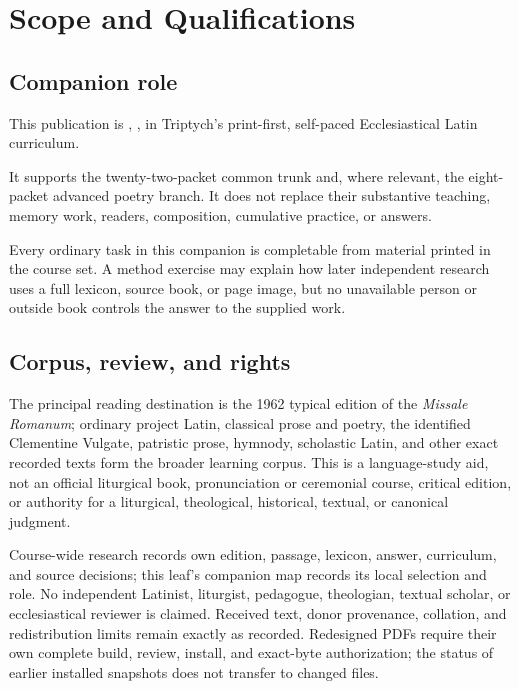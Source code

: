 \chapter{Scope and Qualifications}

\section{Companion role}

This publication is \CompanionID, \emph{\CompanionTitle}, in Triptych's
print-first, self-paced Ecclesiastical Latin curriculum. \CompanionBoundary

It supports the twenty-two-packet common trunk and, where relevant, the
eight-packet advanced poetry branch.  It does not replace their substantive
teaching, memory work, readers, composition, cumulative practice, or answers.
\CompanionPacingNote

Every ordinary task in this companion is completable from material printed in
the course set.  A method exercise may explain how later independent research
uses a full lexicon, source book, or page image, but no unavailable person or
outside book controls the answer to the supplied work.

\section{Corpus, review, and rights}

The principal reading destination is the 1962 typical edition of the
\emph{Missale Romanum}; ordinary project Latin, classical prose and poetry,
the identified Clementine Vulgate, patristic prose, hymnody, scholastic Latin,
and other exact recorded texts form the broader learning corpus.  This is a
language-study aid, not an official liturgical book, pronunciation or
ceremonial course, critical edition, or
authority for a liturgical, theological, historical, textual, or canonical
judgment.

Course-wide research records own edition, passage, lexicon, answer,
curriculum, and source decisions; this leaf's companion map records its local
selection and role.  No independent Latinist, liturgist, pedagogue,
theologian, textual scholar, or ecclesiastical reviewer is claimed.  Received
text, donor provenance, collation, and redistribution limits remain exactly as
recorded.  Redesigned PDFs require their own complete build, review, install,
and exact-byte authorization; the status of earlier installed snapshots does
not transfer to changed files.
